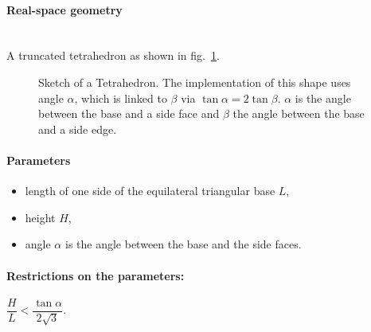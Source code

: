 \paragraph{Real-space geometry}\strut\\
A truncated tetrahedron as shown in fig.~\ref{fig:tetrahedron}.

\begin{figure}[ht]
\hfill
{}
\hfill
{}
\hfill
\caption{Sketch of a Tetrahedron. The implementation of this shape uses angle
  $\alpha$, which is linked to $\beta$ via $\tan \alpha = 2 \tan 
  \beta$. $\alpha$ is the angle between the base and a side face and $\beta$
  the angle between the base and a side edge.}
\label{fig:tetrahedron}
\end{figure}

\FloatBarrier

\paragraph{Parameters}
\begin{itemize}
\item length of one side of the equilateral triangular base $L$,
\item height $H$,
\item angle $\alpha$ is the angle between the base and the
  side faces.
\end{itemize}

\paragraph{Restrictions on the parameters:} 
$\dfrac{H}{L}< \dfrac{\tan{\alpha}}{2\sqrt{3}}$.

